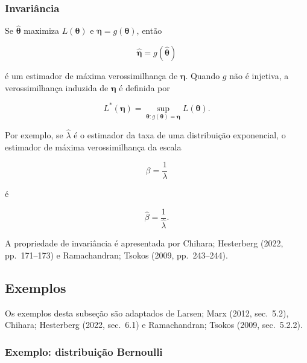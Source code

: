 \documentclass[
  letterpaper,
  DIV=11,
  numbers=noendperiod]{scrreprt}
\begin{document}
\subsubsection{Invariância}\label{invariuxe2ncia}

\begin{tcolorbox}[enhanced jigsaw, colback=white, leftrule=.75mm, colbacktitle=quarto-callout-important-color!10!white, breakable, titlerule=0mm, bottomtitle=1mm, title=\textcolor{quarto-callout-important-color}{\faExclamation}\hspace{0.5em}{Propriedade --- invariância}, colframe=quarto-callout-important-color-frame, toprule=.15mm, opacityback=0, bottomrule=.15mm, opacitybacktitle=0.6, arc=.35mm, toptitle=1mm, rightrule=.15mm, coltitle=black, left=2mm]

Se \(\widehat{\boldsymbol\theta}\) maximiza \(L(\boldsymbol\theta)\) e
\(\boldsymbol\eta=g(\boldsymbol\theta)\), então

\[\widehat{\boldsymbol\eta}
=g(\widehat{\boldsymbol\theta})\]

é um estimador de máxima verossimilhança de \(\boldsymbol\eta\). Quando
\(g\) não é injetiva, a verossimilhança induzida de \(\boldsymbol\eta\)
é definida por

\[L^*(\boldsymbol\eta)
=\sup_{\boldsymbol\theta:g(\boldsymbol\theta)=\boldsymbol\eta}
L(\boldsymbol\theta).\]

\end{tcolorbox}

Por exemplo, se \(\widehat\lambda\) é o estimador da taxa de uma
distribuição exponencial, o estimador de máxima verossimilhança da
escala

\[\beta
=
\frac{1}{\lambda}\]

é

\[\widehat\beta
=
\frac{1}{\widehat\lambda}.\]

A propriedade de invariância é apresentada por Chihara; Hesterberg
(2022, pp.~171--173) e Ramachandran; Tsokos (2009, pp.~243--244).

\subsection*{Exemplos}\label{exemplos}

Os exemplos desta subseção são adaptados de Larsen; Marx (2012,
sec.~5.2), Chihara; Hesterberg (2022, sec.~6.1) e Ramachandran; Tsokos
(2009, sec.~5.2.2).

\subsubsection{Exemplo: distribuição
Bernoulli}\label{exemplo-distribuiuxe7uxe3o-bernoulli}
\end{document}
